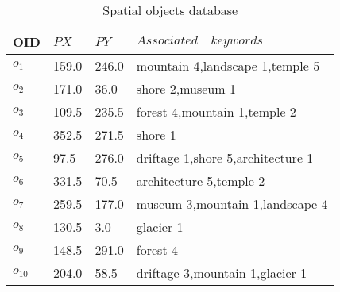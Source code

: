 \begin{table}
\centering
\begin{tabular}{|l|l|l|l|}
\hline
OID & $PX$ & $PY$ & $Associated \quad keywords$ \\
\hline \hline
$o_1$ & 159.0 & 246.0 & mountain 4,landscape 1,temple 5 \\
\hline
$o_2$ & 171.0 & 36.0 & shore 2,museum 1 \\
\hline
$o_3$ & 109.5 & 235.5 & forest 4,mountain 1,temple 2 \\
\hline
$o_4$ & 352.5 & 271.5 & shore 1 \\
\hline
$o_5$ & 97.5 & 276.0 & driftage 1,shore 5,architecture 1 \\
\hline
$o_6$ & 331.5 & 70.5 & architecture 5,temple 2 \\
\hline
$o_7$ & 259.5 & 177.0 & museum 3,mountain 1,landscape 4 \\
\hline
$o_8$ & 130.5 & 3.0 & glacier 1 \\
\hline
$o_9$ & 148.5 & 291.0 & forest 4 \\
\hline
$o_{10}$ & 204.0 & 58.5 & driftage 3,mountain 1,glacier 1 \\
\hline
\end{tabular}
\caption{Spatial objects database}\label{T1}
\end{table}

